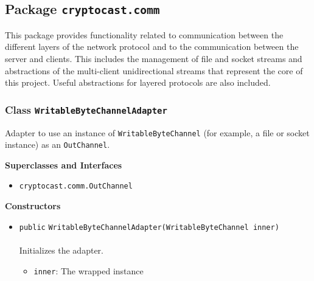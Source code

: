 \subsection{Package \lstinline!cryptocast.comm!}
This package provides functionality related to communication between the different layers
 of the network protocol and to the communication between the server and clients. This includes
 the management of file and socket streams and abstractions of the multi-client unidirectional
 streams that represent the core of this project.
 Useful abstractions for layered protocols are also included.

\subsubsection{Class \lstinline|WritableByteChannelAdapter|}
Adapter to use an instance of \lstinline|WritableByteChannel| (for example, a file or socket instance) as
 an \lstinline|OutChannel|. \\
\noindent\begin{minipage}[t]{5cm}
\vspace{0.3em}
\hspace*{2em}
\vspace{0.3em}
\end{minipage}



\textbf{\sffamily Superclasses and Interfaces}
\begin{itemize}
\item \lstinline|cryptocast.comm.OutChannel|
\end{itemize}


\textbf{\sffamily Constructors}
\begin{itemize}
\item \lstinline|public| \lstinline|WritableByteChannelAdapter|\lstinline|(WritableByteChannel inner)|\\ \\[-0.6em]
Initializes the adapter.
\begin{itemize}
\item \lstinline|inner|: The wrapped instance
\end{itemize}



\end{itemize}


